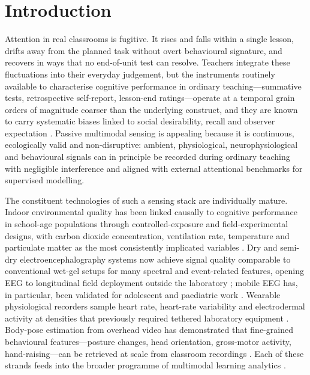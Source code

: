 \section{Introduction}\label{sec:introduction}

Attention in real classrooms is fugitive. It rises and falls within a single lesson, drifts away from the planned task without overt behavioural signature, and recovers in ways that no end-of-unit test can resolve. Teachers integrate these fluctuations into their everyday judgement, but the instruments routinely available to characterise cognitive performance in ordinary teaching---summative tests, retrospective self-report, lesson-end ratings---operate at a temporal grain orders of magnitude coarser than the underlying construct, and they are known to carry systematic biases linked to social desirability, recall and observer expectation \parencite{Fredricks2004_school,DMello2012_dynamics,Hutt2019_mind_wandering}. Passive multimodal sensing is appealing because it is continuous, ecologically valid and non-disruptive: ambient, physiological, neurophysiological and behavioural signals can in principle be recorded during ordinary teaching with negligible interference and aligned with external attentional benchmarks for supervised modelling.

The constituent technologies of such a sensing stack are individually mature. Indoor environmental quality has been linked causally to cognitive performance in school-age populations through controlled-exposure and field-experimental designs, with carbon dioxide concentration, ventilation rate, temperature and particulate matter as the most consistently implicated variables \parencite{Wargocki2007_effects,Bako2012_classroom,Satish2012_co2,Petersen2016_classroom,Allen2016_cogfx}. Dry and semi-dry electroencephalography systems now achieve signal quality comparable to conventional wet-gel setups for many spectral and event-related features, opening EEG to longitudinal field deployment outside the laboratory \parencite{LopezGordo2014_dry_eeg,DiFlumeri2019_dry_eeg_validation,Hinrichs2020_motion_artifacts}; mobile EEG has, in particular, been validated for adolescent and paediatric work \parencite{LauZhu2019_mobile_eeg_review}. Wearable physiological recorders sample heart rate, heart-rate variability and electrodermal activity at densities that previously required tethered laboratory equipment \parencite{SanchezReolid2024_eeg_fnirs}. Body-pose estimation from overhead video has demonstrated that fine-grained behavioural features---posture changes, head orientation, gross-motor activity, hand-raising---can be retrieved at scale from classroom recordings \parencite{Cao2021_openpose,Ahuja2019_edusense}. Each of these strands feeds into the broader programme of multimodal learning analytics \parencite{Blikstein2016_multimodal,Schneider2015_unraveling}.

